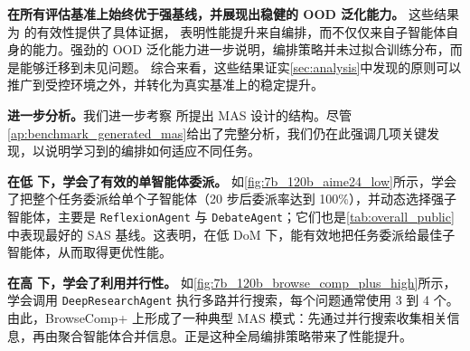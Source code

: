 \textbf{\ourframework 在所有评估基准上始终优于强基线，并展现出稳健的 OOD 泛化能力。}
这些结果为 \ourframework 的有效性提供了具体证据，
表明性能提升来自编排，而不仅仅来自子智能体自身的能力。强劲的 OOD 泛化能力进一步说明，编排策略并未过拟合训练分布，而是能够迁移到未见问题。
综合来看，这些结果证实\cref{sec:analysis}中发现的原则可以推广到受控环境之外，并转化为真实基准上的稳定提升。





\textbf{进一步分析。}我们进一步考察 \ourframework 所提出 MAS 设计的结构。尽管\cref{ap:benchmark_generated_mas}给出了完整分析，我们仍在此强调几项关键发现，以说明学习到的编排如何适应不同任务。


\textbf{在低 \masness 下，\ourframework 学会了有效的单智能体委派。}
如\cref{fig:7b_120b_aime24_low}所示，\ourframework 学会了把整个任务委派给单个子智能体（20 步后委派率达到 100\%），并动态选择强子智能体，主要是 \texttt{ReflexionAgent} 与 \texttt{DebateAgent}；它们也是\cref{tab:overall_public}中表现最好的 SAS 基线。这表明，在低 DoM 下，\ourframework 能有效地把任务委派给最佳子智能体，从而取得更优性能。


\textbf{在高 \masness 下，\ourframework 学会了利用并行性。}
如\cref{fig:7b_120b_browse_comp_plus_high}所示，\ourframework 学会调用 \texttt{DeepResearchAgent} 执行多路并行搜索，每个问题通常使用 3 到 4 个。由此，BrowseComp+ 上形成了一种典型 MAS 模式：先通过并行搜索收集相关信息，再由聚合智能体合并信息。正是这种全局编排策略带来了性能提升。

